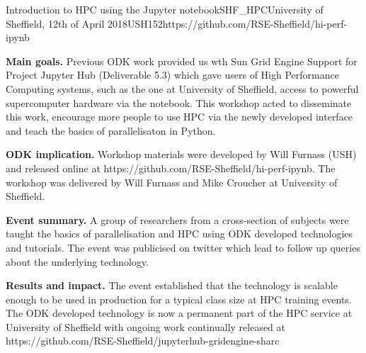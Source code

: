 \begin{event}{Introduction to HPC using the Jupyter notebook}{SHF_HPC}{University of Sheffield, 12th of April 2018}{USH}{15}{2}{https://github.com/RSE-Sheffield/hi-perf-ipynb}

\textbf{Main goals.} Previous ODK work provided us wth Sun Grid Engine Support for Project Jupyter Hub (Deliverable 5.3) which gave users of High Performance Computing systems, such as the one at University of Sheffield, access to powerful supercomputer hardware via the notebook. This workshop acted to disseminate this work, encourage more people to use HPC via the newly developed interface and teach the basics of parallelisaton in Python.

\textbf{ODK implication.} Workshop materials were developed by Will Furnass (USH) and released online at https://github.com/RSE-Sheffield/hi-perf-ipynb. The workshop was delivered by Will Furnass and Mike Croucher at University of Sheffield.

\textbf{Event summary.} A group of researchers from a cross-section of subjects were taught the basics of parallelisation and HPC using ODK developed technologies and tutorials. The event was publicised on twitter which lead to follow up queries about the underlying technology. 

\textbf{Results and impact.} The event established that the technology is scalable enough to be used in production for a typical class size at HPC training events. The ODK developed technology is now a permanent part of the HPC service at University of Sheffield with ongoing work continually released at https://github.com/RSE-Sheffield/jupyterhub-gridengine-sharc

\end{event}
